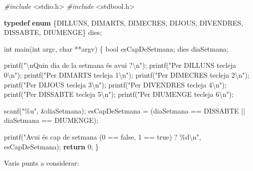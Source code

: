 \documentclass[
]{book}
\newenvironment{Shaded}{\begin{snugshade}}{\end{snugshade}}
\newcommand{\ControlFlowTok}[1]{\textcolor[rgb]{0.13,0.29,0.53}{\textbf{#1}}}
\newcommand{\DataTypeTok}[1]{\textcolor[rgb]{0.13,0.29,0.53}{#1}}
\newcommand{\DecValTok}[1]{\textcolor[rgb]{0.00,0.00,0.81}{#1}}
\newcommand{\ImportTok}[1]{#1}
\newcommand{\KeywordTok}[1]{\textcolor[rgb]{0.13,0.29,0.53}{\textbf{#1}}}
\newcommand{\NormalTok}[1]{#1}
\newcommand{\PreprocessorTok}[1]{\textcolor[rgb]{0.56,0.35,0.01}{\textit{#1}}}
\newcommand{\SpecialCharTok}[1]{\textcolor[rgb]{0.00,0.00,0.00}{#1}}
\newcommand{\StringTok}[1]{\textcolor[rgb]{0.31,0.60,0.02}{#1}}
\begin{document}
\begin{Shaded}
\begin{Highlighting}[]
\PreprocessorTok{\#include }\ImportTok{\textless{}stdio.h\textgreater{}}
\PreprocessorTok{\#include }\ImportTok{\textless{}stdbool.h\textgreater{}}

\KeywordTok{typedef} \KeywordTok{enum}\NormalTok{ \{DILLUNS, DIMARTS, DIMECRES, DIJOUS, DIVENDRES, DISSABTE, DIUMENGE\} dies;}

\DataTypeTok{int}\NormalTok{ main(}\DataTypeTok{int}\NormalTok{ argc, }\DataTypeTok{char}\NormalTok{ **argv) \{}
    \DataTypeTok{bool}\NormalTok{ esCapDeSetmana;}
\NormalTok{    dies diaSetmana;}

\NormalTok{    printf(}\StringTok{"}\SpecialCharTok{\textbackslash{}n}\StringTok{Quin dia de la setmana és avui ?}\SpecialCharTok{\textbackslash{}n}\StringTok{"}\NormalTok{);}
\NormalTok{    printf(}\StringTok{"Per DILLUNS tecleja 0}\SpecialCharTok{\textbackslash{}n}\StringTok{"}\NormalTok{);}
\NormalTok{    printf(}\StringTok{"Per DIMARTS tecleja 1}\SpecialCharTok{\textbackslash{}n}\StringTok{"}\NormalTok{);}
\NormalTok{    printf(}\StringTok{"Per DIMECRES tecleja 2}\SpecialCharTok{\textbackslash{}n}\StringTok{"}\NormalTok{);}
\NormalTok{    printf(}\StringTok{"Per DIJOUS tecleja 3}\SpecialCharTok{\textbackslash{}n}\StringTok{"}\NormalTok{);}
\NormalTok{    printf(}\StringTok{"Per DIVENDRES tecleja 4}\SpecialCharTok{\textbackslash{}n}\StringTok{"}\NormalTok{);}
\NormalTok{    printf(}\StringTok{"Per DISSABTE tecleja 5}\SpecialCharTok{\textbackslash{}n}\StringTok{"}\NormalTok{);}
\NormalTok{    printf(}\StringTok{"Per DIUMENGE tecleja 6}\SpecialCharTok{\textbackslash{}n}\StringTok{"}\NormalTok{);}

\NormalTok{    scanf(}\StringTok{"\%u"}\NormalTok{, \&diaSetmana);}
\NormalTok{    esCapDeSetmana = (diaSetmana == DISSABTE || diaSetmana == DIUMENGE);}

\NormalTok{    printf(}\StringTok{"Avui és cap de setmana (0 == false, 1 == true) ? \%d}\SpecialCharTok{\textbackslash{}n}\StringTok{"}\NormalTok{, esCapDeSetmana);}
    \ControlFlowTok{return} \DecValTok{0}\NormalTok{;}
\NormalTok{\}}
\end{Highlighting}
\end{Shaded}

Varis punts a considerar:
\end{document}
